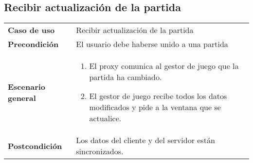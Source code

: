 \subsection{Recibir actualización de la partida}

{\footnotesize
\begin{tabularx}{0.95\textwidth}{p{}|X}

\textbf{Caso de uso} & Recibir actualización de la partida \\

\textbf{Precondición} & El usuario debe haberse unido a una partida \\

\textbf{Escenario general} & \begin{enumerate}
\item El proxy comunica al gestor de juego que la partida ha cambiado.
\item El gestor de juego recibe todos los datos modificados y pide a la ventana
que se actualice.
\end{enumerate} \\
\textbf{Postcondición} & Los datos del cliente y del servidor están
sincronizados.

\end{tabularx}
}

%
%



